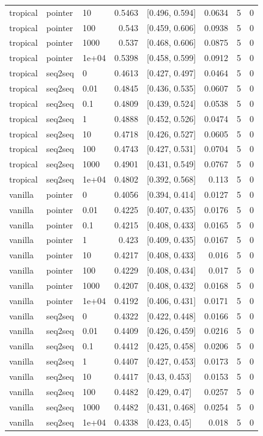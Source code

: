 \documentclass[10pt]{article}
\begin{document}
{\begin{longtable}{lllrlrrr}
tropical & pointer & 10 & 0.5463 & [0.496, 0.594] & 0.0634 & 5 & 0\\
tropical & pointer & 100 & 0.543 & [0.459, 0.606] & 0.0938 & 5 & 0\\
tropical & pointer & 1000 & 0.537 & [0.468, 0.606] & 0.0875 & 5 & 0\\
tropical & pointer & 1e+04 & 0.5398 & [0.458, 0.599] & 0.0912 & 5 & 0\\
tropical & seq2seq & 0 & 0.4613 & [0.427, 0.497] & 0.0464 & 5 & 0\\
tropical & seq2seq & 0.01 & 0.4845 & [0.436, 0.535] & 0.0607 & 5 & 0\\
tropical & seq2seq & 0.1 & 0.4809 & [0.439, 0.524] & 0.0538 & 5 & 0\\
tropical & seq2seq & 1 & 0.4888 & [0.452, 0.526] & 0.0474 & 5 & 0\\
tropical & seq2seq & 10 & 0.4718 & [0.426, 0.527] & 0.0605 & 5 & 0\\
tropical & seq2seq & 100 & 0.4743 & [0.427, 0.531] & 0.0704 & 5 & 0\\
tropical & seq2seq & 1000 & 0.4901 & [0.431, 0.549] & 0.0767 & 5 & 0\\
tropical & seq2seq & 1e+04 & 0.4802 & [0.392, 0.568] & 0.113 & 5 & 0\\
vanilla & pointer & 0 & 0.4056 & [0.394, 0.414] & 0.0127 & 5 & 0\\
vanilla & pointer & 0.01 & 0.4225 & [0.407, 0.435] & 0.0176 & 5 & 0\\
vanilla & pointer & 0.1 & 0.4215 & [0.408, 0.433] & 0.0165 & 5 & 0\\
vanilla & pointer & 1 & 0.423 & [0.409, 0.435] & 0.0167 & 5 & 0\\
vanilla & pointer & 10 & 0.4217 & [0.408, 0.433] & 0.016 & 5 & 0\\
vanilla & pointer & 100 & 0.4229 & [0.408, 0.434] & 0.017 & 5 & 0\\
vanilla & pointer & 1000 & 0.4207 & [0.408, 0.432] & 0.0168 & 5 & 0\\
vanilla & pointer & 1e+04 & 0.4192 & [0.406, 0.431] & 0.0171 & 5 & 0\\
vanilla & seq2seq & 0 & 0.4322 & [0.422, 0.448] & 0.0166 & 5 & 0\\
vanilla & seq2seq & 0.01 & 0.4409 & [0.426, 0.459] & 0.0216 & 5 & 0\\
vanilla & seq2seq & 0.1 & 0.4412 & [0.425, 0.458] & 0.0206 & 5 & 0\\
vanilla & seq2seq & 1 & 0.4407 & [0.427, 0.453] & 0.0173 & 5 & 0\\
vanilla & seq2seq & 10 & 0.4417 & [0.43, 0.453] & 0.0153 & 5 & 0\\
vanilla & seq2seq & 100 & 0.4482 & [0.429, 0.47] & 0.0257 & 5 & 0\\
vanilla & seq2seq & 1000 & 0.4482 & [0.431, 0.468] & 0.0254 & 5 & 0\\
vanilla & seq2seq & 1e+04 & 0.4338 & [0.423, 0.45] & 0.018 & 5 & 0\\
\bottomrule
\end{longtable}
}
\end{document}
